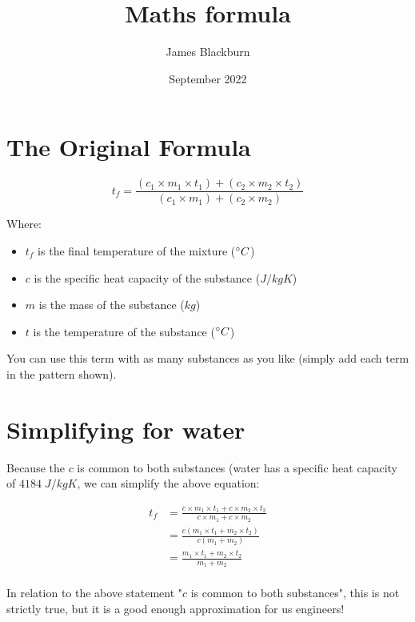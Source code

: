 \documentclass{article}
\title{Maths formula}
\author{James Blackburn}
\date{September 2022}
\begin{document}
\maketitle

\section{The Original Formula}

\[
t_f = \frac{(c_1 \times m_1 \times t_1) + (c_2 \times m_2 \times t_2)}{(c_1 \times m_1) + (c_2 \times m_2)}
\]

Where:

\begin{itemize}
\item \(t_f\) is the final temperature of the mixture (\(\degree C\))
\item \(c\) is the specific heat capacity of the substance (\(J/kg K\))
\item \(m\) is the mass of the substance (\(kg\))
\item \(t\) is the temperature of the substance (\(\degree C\))
\end{itemize}

You can use this term with as many substances as you like (simply add each term in the pattern shown).

\section{Simplifying for water}

Because the \(c\) is common to both substances (water has a specific heat capacity of \(4184 \; J/kg K\), we can simplify the above equation:

\[
\begin{aligned}
    t_f &= \frac{c \times m_1 \times t_1 + c \times m_2 \times t_2}{c \times m_1 + c \times m_2} \\
    &= \frac{c(m_1 \times t_1 + m_2 \times t_2)}{c(m_1 + m_2)} \\
    &= \frac{m_1 \times t_1 + m_2 \times t_2}{m_1 + m_2} \\
\end{aligned}
\]

In relation to the above statement "\(c\) is common to both substances", this is not strictly true, but it is a good enough approximation for us engineers!
\end{document}
